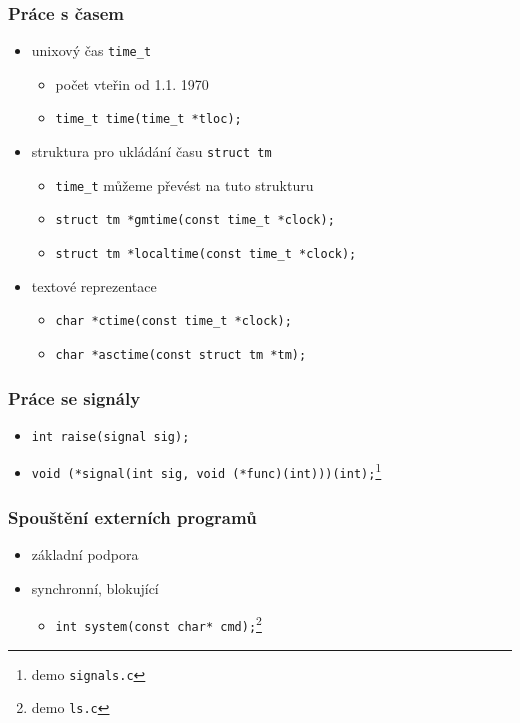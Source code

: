 \begin{frame}
	\frametitle{Práce s časem}
	\begin{itemize}
		\item{unixový čas \texttt{time\_t}}
		\begin{itemize}
			\item{počet vteřin od 1.1. 1970}
			\item{\texttt{time\_t time(time\_t *tloc);}}
		\end{itemize}
		\item{struktura pro ukládání času \texttt{struct tm}}
		\begin{itemize}
			\item{\texttt{time\_t} můžeme převést na tuto strukturu}
			\item{\texttt{struct tm *gmtime(const time\_t *clock);}}
			\item{\texttt{struct tm *localtime(const time\_t *clock);}}
		\end{itemize}
		\item{textové reprezentace}
		\begin{itemize}
			\item{\texttt{char *ctime(const time\_t *clock);}}
			\item{\texttt{char *asctime(const struct tm *tm);}}
		\end{itemize}
	\end{itemize}
\end{frame}

\begin{frame}
	\frametitle{Práce se signály}
	\begin{itemize}
		\item{\texttt{int raise(signal sig);}}
		\item{\texttt{void (*signal(int sig, void (*func)(int)))(int);}\footnote{demo \texttt{signals.c}}}
	\end{itemize}
\end{frame}

\begin{frame}
	\frametitle{Spouštění externích programů}
	\begin{itemize}
		\item{základní podpora}
		\item{synchronní, blokující}
		\begin{itemize}
			\item{\texttt{int system(const char* cmd);}\footnote{demo \texttt{ls.c}}}
		\end{itemize}
	\end{itemize}
\end{frame}

